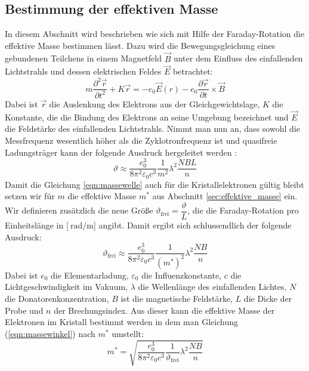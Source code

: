 \subsection{Bestimmung der effektiven Masse}
\label{sec:effektivemasse}
In diesem Abschnitt wird beschrieben wie sich mit Hilfe der Faraday-Rotation die effektive Masse bestimmen lässt. Dazu wird die Bewegungsgleichung eines gebundenen Teilchens in einem Magnetfeld $\vec{B}$ unter dem Einfluss des einfallenden Lichtstrahls und dessen elektrischen Feldes $\vec{E}$ betrachtet:
\begin{equation}
  \label{eqn:bewegung}
  m\dfrac{\partial^2\vec{r}}{\partial t^2}+K\vec{r}=-e_\mathrm{0}\vec{E}(r)-e_\mathrm{0}\dfrac{\partial \vec{r}}{\partial t}\times \vec{B}
\end{equation}
Dabei ist $\vec{r}$ die Auslenkung des Elektrons aus der Gleichgewichtslage, $K$ die Konstante, die die Bindung des Elektrons an seine Umgebung bezeichnet und $\vec{E}$ die Feldstärke des einfallenden Lichtstrahls. Nimmt man nun an, dass sowohl die Messfrequenz wesentlich höher als die Zyklotronfrequenz ist und quasifreie Ladungsträger kann der folgende Ausdruck hergeleitet werden \cite[5-8]{Anleitung}:
\begin{equation}
  \label{eqn:massewelle}
  \vartheta\approx\dfrac{e_\mathrm{0}^3}{8\pi^2\varepsilon_\mathrm{0}c^3}\dfrac{1}{m^2}\lambda^2\dfrac{NBL}{n}
\end{equation}
Damit die Gleichung \ref{eqn:massewelle} auch für die Kristallelektronen gültig bleibt setzen wir für $m$ die effektive Masse $m^*$ aus Abschnitt \ref{sec:effektive_masse} ein. Wir definieren zusätzlich die neue Größe $\vartheta_\mathrm{frei}=\dfrac{\vartheta}{L}$, die die Faraday-Rotation pro Einheitslänge in [$\SI{}{\radian\per\meter}$] angibt. Damit ergibt sich schlussendlich der folgende Ausdruck:
\begin{equation}
  \label{eqn:massewinkel}
  \vartheta_\mathrm{frei}\approx\dfrac{e_\mathrm{0}^3}{8\pi^2\varepsilon_\mathrm{0}c^3}\dfrac{1}{(m^*)^2}\lambda^2\dfrac{NB}{n}
\end{equation}
Dabei ist $e_\mathrm{0}$ die Elementarladung, $\varepsilon_\mathrm{0}$ die Influenzkonstante, $c$ die Lichtgeschwindigkeit im Vakuum, $\lambda$ die Wellenlänge des einfallenden Lichtes, $N$ die Donatorenkonzentration, $B$ ist die magnetische Feldstärke, $L$ die Dicke der Probe und $n$ der Brechungsindex.
Aus dieser kann die effektive Masse der Elektronen im Kristall bestimmt werden in dem man Gleichung (\ref{eqn:massewinkel}) nach $m^*$ umstellt:
\begin{equation}
  \label{eqn:massefinal}
  m^*=\sqrt{\dfrac{e_\mathrm{0}^3}{8\pi^2\varepsilon_\mathrm{0}c^3}\dfrac{1}{\vartheta_\mathrm{frei}}\lambda^2\dfrac{NB}{n}}
\end{equation}
